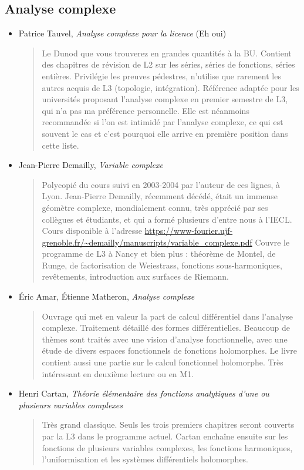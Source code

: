\documentclass{article}
\begin{document}
\subsection{Analyse complexe}

\begin{mdframed}
\begin{itemize}
\item Patrice Tauvel, \emph{Analyse complexe pour la licence} (Eh oui)
\begin{quote}
Le \og Dunod\fg{} que vous trouverez en grandes quantités à la BU. Contient des chapitres de révision de L2 sur les séries, séries de fonctions, séries entières. Privilégie les preuves pédestres, n'utilise que rarement les autres acquis de L3 (topologie, intégration).  Référence adaptée pour les universités proposant l'analyse complexe en premier semestre de L3, qui n'a pas ma préférence personnelle. Elle est néanmoins recommandée si l'on est intimidé par l'analyse complexe, ce qui est souvent le cas et c'est pourquoi elle arrive en première position dans cette liste.
\end{quote}
\end{itemize}
\end{mdframed}
\begin{itemize}
\item Jean-Pierre Demailly, \emph{Variable complexe}
\begin{quote}
Polycopié du cours suivi en 2003-2004 par l'auteur de ces lignes, à Lyon. Jean-Pierre Demailly, récemment décédé, était un immense géomètre complexe, mondialement connu, très apprécié par ses collègues et étudiants, et qui a formé plusieurs d'entre nous à l'IECL. Cours disponible à l'adresse \url{https://www-fourier.ujf-grenoble.fr/~demailly/manuscripts/variable_complexe.pdf} Couvre le programme de L3 à Nancy et bien plus : théorème de Montel, de Runge, de factorisation de Weiestrass, fonctions sous-harmoniques, revêtements, introduction aux surfaces de Riemann.
\end{quote}
\item Éric Amar, Étienne Matheron, \emph{Analyse complexe}
\begin{quote}
Ouvrage qui met en valeur la part de calcul différentiel dans l'analyse complexe. Traitement détaillé des formes différentielles. Beaucoup de thèmes sont traités avec une vision d'analyse fonctionnelle, avec une étude de divers espaces fonctionnels de fonctions holomorphes. Le livre contient aussi une partie sur le calcul fonctionnel holomorphe. Très intéressant en deuxième lecture ou en M1.
\end{quote}
\item Henri Cartan, \emph{Théorie élémentaire des fonctions analytiques d'une ou plusieurs variables complexes}
\begin{quote}
Très grand classique. Seuls les trois premiers chapitres seront couverts par la L3 dans le programme actuel. Cartan enchaîne ensuite sur les fonctions de plusieurs variables complexes, les fonctions harmoniques, l'uniformisation et les systèmes différentiels holomorphes.
\end{quote}
\end{itemize}
\end{document}
